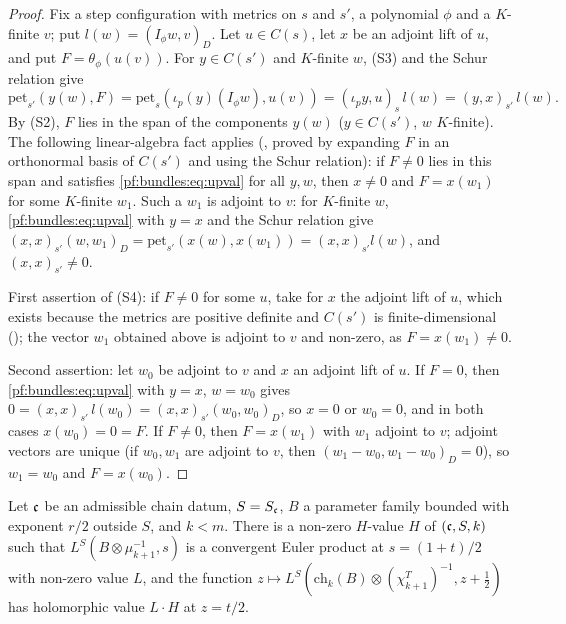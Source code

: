 \begin{proof}
Fix a step configuration with metrics on $s$ and $s'$, a polynomial $\phi$ and a $K$-finite $v$; put $l(w)=(I_\phi w,v)_D$. Let $u\in C(s)$,
let $x$ be an adjoint lift of $u$, and put $F=\theta_\phi(u(v))$. For $y\in C(s')$ and $K$-finite $w$, (S3) and the Schur relation give
\begin{equation}\label{pf:bundles:eq:upval}
\mathrm{pet}_{s'}(y(w),F)=\mathrm{pet}_s(\iota_p(y)(I_\phi w),u(v))=(\iota_py,u)_s\,l(w)=(y,x)_{s'}\,l(w).
\end{equation}
By (S2), $F$ lies in the span of the components $y(w)$ ($y\in C(s')$, $w$ $K$-finite). The following linear-algebra fact applies
(, proved by expanding $F$ in an orthonormal basis of $C(s')$ and using the
Schur relation): if $F\neq0$ lies in this span and satisfies \eqref{pf:bundles:eq:upval} for all $y,w$, then $x\ne0$ and $F=x(w_1)$ for
some $K$-finite $w_1$. Such a $w_1$ is adjoint to $v$: for $K$-finite $w$, \eqref{pf:bundles:eq:upval} with $y=x$ and the Schur relation
give $(x,x)_{s'}(w,w_1)_D=\mathrm{pet}_{s'}(x(w),x(w_1))=(x,x)_{s'}l(w)$, and $(x,x)_{s'}\ne0$.

First assertion of (S4): if $F\ne0$ for some $u$, take for $x$ the adjoint lift of $u$, which exists because the metrics are positive definite
and $C(s')$ is finite-dimensional (); the vector $w_1$ obtained above is adjoint to $v$ and
non-zero, as $F=x(w_1)\ne0$.

Second assertion: let $w_0$ be adjoint to $v$ and $x$ an adjoint lift of $u$. If $F=0$, then \eqref{pf:bundles:eq:upval} with $y=x$, $w=w_0$ gives
$0=(x,x)_{s'}\,l(w_0)=(x,x)_{s'}(w_0,w_0)_D$, so $x=0$ or $w_0=0$, and in both cases $x(w_0)=0=F$. If $F\neq0$, then $F=x(w_1)$ with $w_1$ adjoint to
$v$; adjoint vectors are unique (if $w_0,w_1$ are adjoint to $v$, then $(w_1-w_0,w_1-w_0)_D=0$), so $w_1=w_0$ and $F=x(w_0)$.
\end{proof}

\begin{lemma}\label{pf:bundles:lem:lfull}
Let $\mathfrak c$ be an admissible chain datum, $S=S_\mathfrak c$, $B$ a parameter family bounded with exponent $r/2$ outside $S$, and $k<m$. There is
a non-zero $H$-value $H$ of $(\mathfrak c,S,k)$ such that $L^S(B\otimes\mu_{k+1}^{-1},s)$ is a convergent Euler product at $s=(1+t)/2$ with
non-zero value $L$, and the function $z\mapsto L^S(\mathrm{ch}_k(B)\otimes(\chi^T_{k+1})^{-1},z+\frac12)$ has holomorphic value $L\cdot H$ at
$z=t/2$.
\end{lemma}

